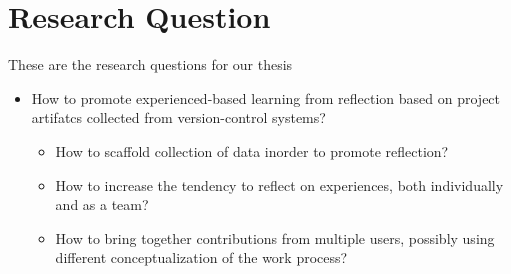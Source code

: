 \section{Research Question}
These are the research questions for our thesis
\begin{itemize}
	\item How to promote experienced-based learning from reflection based on project artifatcs collected from version-control systems?
	\begin{itemize}
		\item How to scaffold collection of data inorder to promote reflection?
		\item How to increase the tendency to reflect on experiences, both individually and as a team? 
		\item How to bring together contributions from multiple users, possibly using different conceptualization of the work process? 
	\end{itemize}
\end{itemize}